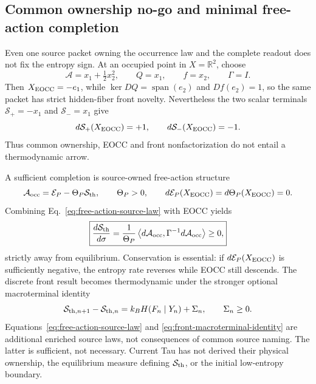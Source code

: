 \documentclass[11pt]{article}
\begin{document}
\subsection{Common ownership no-go and minimal free-action completion}

Even one source packet owning the occurrence law and the complete readout does
not fix the entropy sign.  At an occupied point in $X=\mathbb R^2$, choose
\begin{equation}
 \mathcal A=x_1+\tfrac12x_2^2,\qquad
 Q=x_1,\qquad f=x_2,\qquad \Gamma=I.
 \label{eq:common-source-countermodel}
\end{equation}
Then $X_{\rm EOCC}=-e_1$, while
$\ker DQ=\operatorname{span}(e_2)$ and $Df(e_2)=1$, so the same packet has
strict hidden-fiber front novelty.  Nevertheless the two scalar terminals
$\mathcal S_+=-x_1$ and $\mathcal S_-=x_1$ give
\begin{equation}
 d\mathcal S_+(X_{\rm EOCC})=+1,\qquad
 d\mathcal S_-(X_{\rm EOCC})=-1.
 \label{eq:common-source-opposite-arrows}
\end{equation}
Thus common ownership, EOCC and front nonfactorization do not entail a
thermodynamic arrow.

A sufficient completion is source-owned free-action structure
\begin{equation}
 \mathcal A_{\rm occ}=\mathcal E_P-\Theta_P\mathcal S_{\rm th},
 \qquad \Theta_P>0,\qquad
 d\mathcal E_P(X_{\rm EOCC})=d\Theta_P(X_{\rm EOCC})=0.
 \label{eq:free-action-source-law}
\end{equation}
Combining Eq.~\eqref{eq:free-action-source-law} with EOCC yields
\begin{equation}
 \boxed{
 \frac{d\mathcal S_{\rm th}}{d\sigma}
 =\frac{1}{\Theta_P}
 \left\langle d\mathcal A_{\rm occ},
 \Gamma^{-1}d\mathcal A_{\rm occ}\right\rangle\ge0,}
 \label{eq:free-action-entropy-theorem}
\end{equation}
strictly away from equilibrium.  Conservation is essential: if
$d\mathcal E_P(X_{\rm EOCC})$ is sufficiently negative, the entropy rate
reverses while EOCC still descends.  The discrete front result becomes
thermodynamic under the stronger optional macroterminal identity
\begin{equation}
 \mathcal S_{{\rm th},n+1}-\mathcal S_{{\rm th},n}
 =k_BH(F_n\mid Y_n)+\Sigma_n,\qquad \Sigma_n\ge0.
 \label{eq:front-macroterminal-identity}
\end{equation}
Equations~\eqref{eq:free-action-source-law} and
\eqref{eq:front-macroterminal-identity} are additional enriched source laws,
not consequences of common source naming.  The latter is sufficient, not
necessary.  Current Tau has not derived their
physical ownership, the equilibrium measure defining
$\mathcal S_{\rm th}$, or the initial low-entropy boundary.
\end{document}
